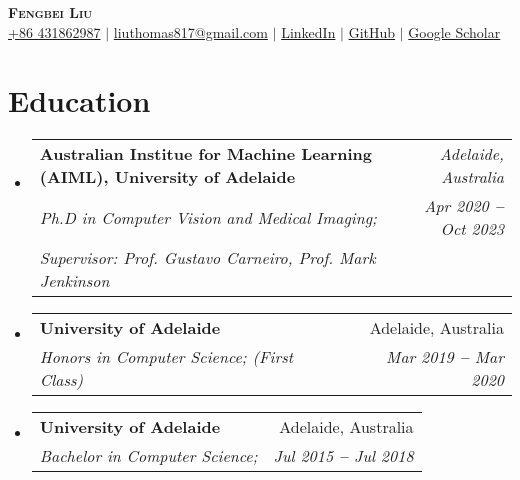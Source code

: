 \documentclass[letterpaper,11pt]{article}
\makeatletter
\newcommand{\resumeSubheading}[4]{
  \vspace{-2pt}\item
    \begin{tabular*}{0.97\textwidth}[t]{l@{\extracolsep{\fill}}r}
      \textbf{#1} & #2 \\
      \textit{\small#3} & \textit{\small #4} \\
    \end{tabular*}\vspace{-7pt}
}
\newcommand{\resumePhdheading}[5]{
  \vspace{-2pt}\item
    \begin{tabular*}{0.97\textwidth}[t]{l@{\extracolsep{\fill}}r}
      \textbf{#1} & \textit{\small #2}\\
      \textit{\small#3} & \textit{\small #4} \\
      \textit{\small #5} \\
    \end{tabular*}\vspace{-7pt}
}
\newcommand{\resumeSubHeadingListStart}{\begin{itemize}[leftmargin=0.15in, label={}]}
\newcommand{\resumeSubHeadingListEnd}{\end{itemize}}
\makeatother
\begin{document}

\begin{center}
    \textbf{\Huge \scshape Fengbei Liu} \\ \vspace{3pt}
    \small
    \faMobile \hspace{.5pt} \href{tel:905314204536}{+86 431862987}
    $|$
    \faAt \hspace{.5pt} \href{mailto:arasgungore09@gmail.com}{liuthomas817@gmail.com}
    $|$
    \faLinkedinSquare \hspace{.5pt} \href{https://www.linkedin.com/in/fengbei-liu-2bb11b177/}{LinkedIn}
    $|$
    \faGithub \hspace{.5pt} \href{https://github.com/FBLADL?tab=repositories}{GitHub}
    $|$
    \faGlobe \hspace{.5pt} \href{https://scholar.google.com.au/citations?user=oY_qRxMAAAAJ&hl}{Google Scholar}
\end{center}




\section{Education}
  \vspace{3pt}
  \resumeSubHeadingListStart


    \resumePhdheading
      {Australian Institue for Machine Learning (AIML), University of Adelaide
      }{Adelaide, Australia}
      {Ph.D in Computer Vision and Medical Imaging;   }{Apr 2020 \textbf{--} Oct 2023}{Supervisor: Prof. Gustavo Carneiro, Prof. Mark Jenkinson}
    \resumeSubheading{University of Adelaide}{Adelaide, Australia}{Honors in Computer Science; (First Class)}{Mar 2019 \textbf{--} Mar 2020}
    \resumeSubheading{University of Adelaide}{Adelaide, Australia}{Bachelor in Computer Science; }{Jul 2015 \textbf{--} Jul 2018}
  \resumeSubHeadingListEnd



\end{document}
